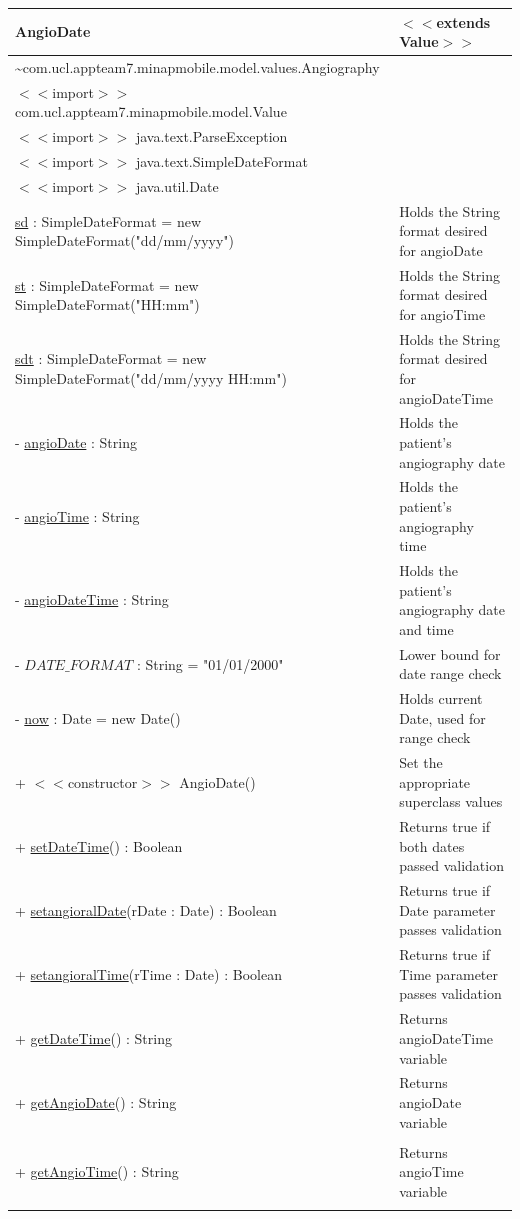 \documentclass[12pt,a4paper,oneside,titlepage]{article}
\begin{document}
\begin{center}
	\begin{tabular}{| p{13cm} | p{5cm} |}
	\hline
	\textbf{AngioDate} & \textbf{$<<$extends Value$>>$} \\ \hline
	\textasciitilde com.ucl.appteam7.minapmobile.model.values.Angiography & \\ \hline
	$<<$import$>>$ com.ucl.appteam7.minapmobile.model.Value & \\ \hline
	$<<$import$>>$ java.text.ParseException & \\ \hline
	$<<$import$>>$ java.text.SimpleDateFormat & \\ \hline
	$<<$import$>>$ java.util.Date & \\ \hline \hline
	\underline{sd} : SimpleDateFormat = new SimpleDateFormat("dd/mm/yyyy") & Holds the String format desired for angioDate \\ \hline
	\underline{st} : SimpleDateFormat = new SimpleDateFormat("HH:mm") & Holds the String format desired for angioTime \\ \hline
	\underline{sdt} : SimpleDateFormat = new SimpleDateFormat("dd/mm/yyyy HH:mm") & Holds the String format desired for angioDateTime \\ \hline
	- \underline{angioDate} : String & Holds the patient's angiography date \\ \hline
	- \underline{angioTime} : String & Holds the patient's angiography time \\ \hline
	- \underline{angioDateTime} : String & Holds the patient's angiography date and time \\ \hline
	- \underline{$DATE\_FORMAT$} : String = "01/01/2000" & Lower bound for date range check \\ \hline
	- \underline{now} : Date = new Date() & Holds current Date, used for range check \\ \hline \hline
	+ $<<$constructor$>>$ AngioDate() & Set the appropriate superclass values \\ \hline
	+ \underline{setDateTime}() : Boolean & Returns true if both dates passed validation \\ \hline
	+ \underline{setangioralDate}(rDate : Date) : Boolean & Returns true if Date parameter passes validation \\ \hline
	+ \underline{setangioralTime}(rTime : Date) : Boolean & Returns true if Time parameter passes validation \\ \hline
	+ \underline{getDateTime}() : String & Returns angioDateTime variable \\ \hline
	+ \underline{getAngioDate}() : String & Returns angioDate variable \\&\\ \hline
	+ \underline{getAngioTime}() : String & Returns angioTime variable \\ &\\ \hline
	\end{tabular}
\end{center}
\end{document}
